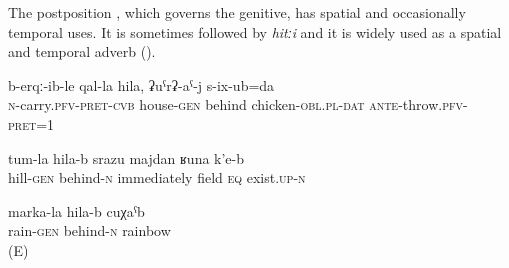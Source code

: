 The postposition , which governs the genitive, has spatial and occasionally temporal uses. It is sometimes followed by \textit{hitːi} and it is widely used as a spatial and temporal adverb ().
%
\begin{exe}
	\ex
	\begin{xlist}
		\ex	\label{I carried (the cheese) behind the house and fed it to the chicken}
		\gll	b-erqː-ib-le	qal-la	hila,	ʡuˁrʡ-aˁ-j	s-ix-ub=da  \\
			\textsc{n}-carry.\textsc{pfv}-\textsc{pret}-\textsc{cvb}	house-\textsc{gen}	behind	chicken-\textsc{obl}.\textsc{pl}-\textsc{dat}	\textsc{ante}-throw.\textsc{pfv}-\textsc{pret}=1\\
		\glt	{}

		\ex	\label{There behind the hill there is immediately something like a field}
		\gll	tum-la	hila-b	srazu	majdan ʁuna	k'e-b\\
			hill-\textsc{gen}	behind-\textsc{n}	immediately	field	\textsc{eq}	exist.\textsc{up-n}\\
		\glt	{}

		\ex	\label{a rainbow after the rain}
		\gll	marka-la	hila-b	cuχaˁb  \\
			rain-\textsc{gen}	behind-\textsc{n}	rainbow\\
		\glt	{} (E)
	\end{xlist}
\end{exe}



\subsection{ }
\label{ssec:postposition hiti}

